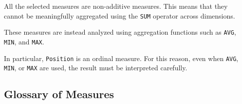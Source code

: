 \documentclass[a4paper,11pt]{article}
\begin{document}
	All the selected measures are non-additive measures. This means that they cannot be
	meaningfully aggregated using the \texttt{SUM} operator across dimensions.
	
	These measures are instead analyzed using aggregation functions such as
	\texttt{AVG}, \texttt{MIN}, and \texttt{MAX}.
	
	In particular, \texttt{Position} is an ordinal measure. For this reason, even when
	\texttt{AVG}, \texttt{MIN}, or \texttt{MAX} are used, the result must be interpreted
	carefully.

	\subsection{Glossary of Measures}
	
\end{document}
